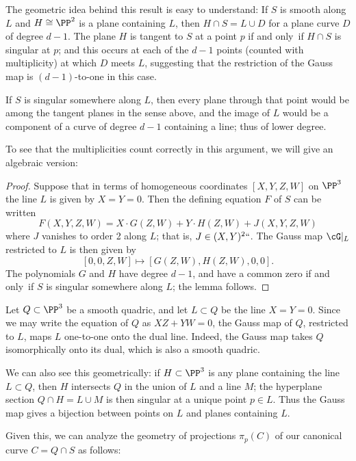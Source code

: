 The geometric idea behind this result is easy to understand: If $S$ is
smooth along $L$ and $H\cong \PP^{2}$ is a plane containing $L$, then
$H\cap S = L \cup D$ for a plane curve $D$ of degree $d-1$. The plane
$H$ is tangent to $S$ at a point $p$ if and only~if $H\cap S$ is
singular at $p$; and this occurs at each of the $d-1$ points (counted
with multiplicity) at which $D$ meets $L$, suggesting that the
restriction of the Gauss map is $(d{-}1)$-to-one in this case.

If $S$ is singular somewhere along $L$, then every plane through that point would be among the tangent
planes in the sense above, and the image of $L$ would be a component of a curve of degree $d-1$ containing a line; thus of lower degree.

To see that the multiplicities count correctly in this argument, we will give an algebraic version:
\unif

\begin{proof}
Suppose that in terms of homogeneous coordinates $[X,Y,Z,W]$ on $\PP^3$ the line $L$ is given by $X = Y = 0$. Then the defining equation $F$ of $S$ can be written
$$
F(X,Y,Z,W) = X\cdot G(Z,W) + Y\cdot H(Z,W) + J(X,Y,Z,W)
$$
where $J$ vanishes to order 2 along $L$; that is, $J \in (X,Y)^2` `$. The Gauss map $\cG|_L$ restricted to $L$ is then given by
$$
[0,0,Z,W] \mapsto [G(Z,W), H(Z,W), 0, 0].
$$
The polynomials $G$ and $H$ have degree $d-1$, and have a common zero if and only~if $S$ is singular somewhere along $L$; the lemma follows.
\end{proof}

\begin{example}
\label{Gauss of Quadric}
Let $Q\subset \PP^3$ be a smooth quadric,
%
%
and let $L\subset Q$ be the line $X=Y =0$. Since we may write the
equation of $Q$ as $XZ+YW = 0$, the Gauss map of $Q$, restricted to
$L$, maps $L$ one-to-one onto the dual line. Indeed, the
Gauss map
takes $Q$ isomorphically onto its dual, which is also a smooth quadric.

 We can also see this geometrically: if $H \subset \PP^3$ is any plane containing the line $L \subset Q$, then $H$ intersects $Q$ in the union of $L$ and a line $M$; the hyperplane section $Q \cap H = L \cup M$ is then singular at a unique point $p \in L$. Thus the Gauss map gives a bijection between points on $L$ and planes containing $L$.
\unif
\end{example}

Given this, we can analyze the geometry of projections $\pi_p(C)$ of our canonical curve $C = Q \cap S$ as follows:

